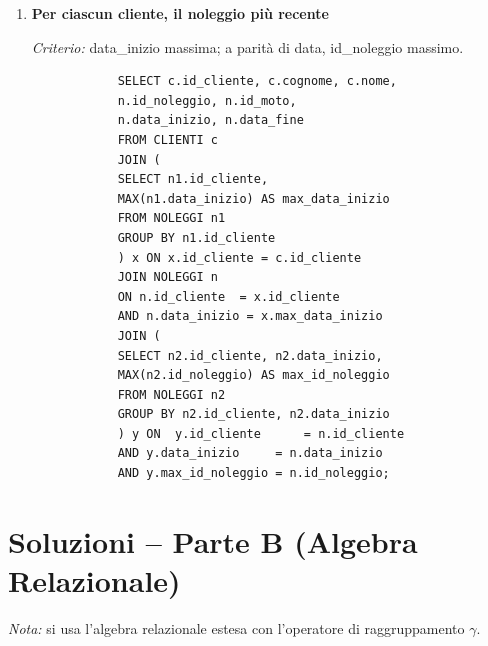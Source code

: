 \documentclass[a4paper,12pt]{article}
\begin{document}
\begin{enumerate}
		\textit{Idea:} contare le categorie distinte noleggiate per cliente e confrontarle con il totale delle categorie attive.
		
		\begin{lstlisting}
			SELECT c.id_cliente, c.cognome, c.nome
			FROM CLIENTI c
			JOIN NOLEGGI n ON n.id_cliente = c.id_cliente
			JOIN MOTO m    ON m.id_moto    = n.id_moto
			WHERE m.attiva = 1
			GROUP BY c.id_cliente, c.cognome, c.nome
			HAVING COUNT(DISTINCT m.categoria) = (
			SELECT COUNT(DISTINCT m2.categoria)
			FROM MOTO m2
			WHERE m2.attiva = 1
			);
		\end{lstlisting}
		
		\item \textbf{Per ciascun cliente, il noleggio pi\`u recente}
		
		\textit{Criterio:} data\_inizio massima; a parit\`a di data, id\_noleggio massimo.
		
		\begin{lstlisting}
			SELECT c.id_cliente, c.cognome, c.nome,
			n.id_noleggio, n.id_moto,
			n.data_inizio, n.data_fine
			FROM CLIENTI c
			JOIN (
			SELECT n1.id_cliente,
			MAX(n1.data_inizio) AS max_data_inizio
			FROM NOLEGGI n1
			GROUP BY n1.id_cliente
			) x ON x.id_cliente = c.id_cliente
			JOIN NOLEGGI n
			ON n.id_cliente  = x.id_cliente
			AND n.data_inizio = x.max_data_inizio
			JOIN (
			SELECT n2.id_cliente, n2.data_inizio,
			MAX(n2.id_noleggio) AS max_id_noleggio
			FROM NOLEGGI n2
			GROUP BY n2.id_cliente, n2.data_inizio
			) y ON  y.id_cliente      = n.id_cliente
			AND y.data_inizio     = n.data_inizio
			AND y.max_id_noleggio = n.id_noleggio;
		\end{lstlisting}
		
	\end{enumerate}
	
	\section*{Soluzioni -- Parte B (Algebra Relazionale)}
	
	\textit{Nota:} si usa l'algebra relazionale estesa con l'operatore di raggruppamento $\gamma$.
	
\end{document}
